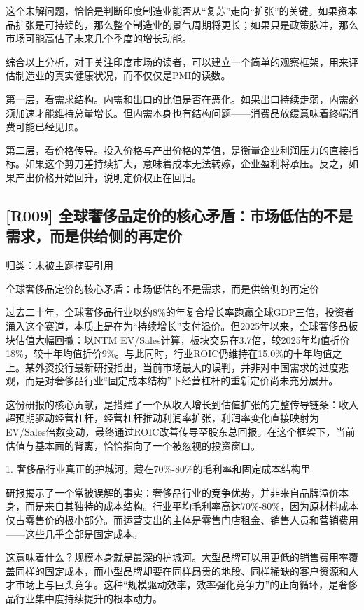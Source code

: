 \documentclass[11pt]{ctexart}
\begin{document}
这个未解问题，恰恰是判断印度制造业能否从“复苏”走向“扩张”的关键。如果资本品扩张是可持续的，那么整个制造业的景气周期将更长；如果只是政策脉冲，那么市场可能高估了未来几个季度的增长动能。

综合以上分析，对于关注印度市场的读者，可以建立一个简单的观察框架，用来评估制造业的真实健康状况，而不仅仅是PMI的读数。

第一层，看需求结构。内需和出口的比值是否在恶化。如果出口持续走弱，内需必须加速才能维持总量增长。但内需本身也有结构问题——消费品放缓意味着终端消费可能已经见顶。

第二层，看价格传导。投入价格与产出价格的差值，是衡量企业利润压力的直接指标。如果这个剪刀差持续扩大，意味着成本无法转嫁，企业盈利将承压。反之，如果产出价格开始回升，说明定价权正在回归。

\subsection{[R009] 全球奢侈品定价的核心矛盾：市场低估的不是需求，而是供给侧的再定价}
{\small\color{refgray}归类：未被主题摘要引用}

全球奢侈品定价的核心矛盾：市场低估的不是需求，而是供给侧的再定价

过去二十年，全球奢侈品行业以约8\%的年复合增长率跑赢全球GDP三倍，投资者涌入这个赛道，本质上是在为“持续增长”支付溢价。但2025年以来，全球奢侈品板块估值大幅回撤：以NTM EV/Sales计算，板块交易在3.7倍，较2025年均值折价18\%，较十年均值折价9\%。与此同时，行业ROIC仍维持在15.0\%的十年均值之上。某外资投行最新研报指出，当前市场最大的误判，并非对中国需求的过度悲观，而是对奢侈品行业“固定成本结构”下经营杠杆的重新定价尚未充分展开。

这份研报的核心贡献，是搭建了一个从收入增长到估值扩张的完整传导链条：收入超预期驱动经营杠杆，经营杠杆推动利润率扩张，利润率变化直接映射为EV/Sales倍数变动，最终通过ROIC改善传导至股东总回报。在这个框架下，当前估值与基本面的背离，恰恰指向了一个被忽视的投资窗口。

1. 奢侈品行业真正的护城河，藏在70\%-80\%的毛利率和固定成本结构里

研报揭示了一个常被误解的事实：奢侈品行业的竞争优势，并非来自品牌溢价本身，而是来自其独特的成本结构。行业平均毛利率高达70\%-80\%，因为原材料成本仅占零售价的极小部分。而运营支出的主体是零售门店租金、销售人员和营销费用——这些几乎全部是固定成本。

这意味着什么？规模本身就是最深的护城河。大型品牌可以用更低的销售费用率覆盖同样的固定成本，而小型品牌却要在同样昂贵的地段、同样稀缺的客户资源和人才市场上与巨头竞争。这种“规模驱动效率，效率强化竞争力”的正向循环，是奢侈品行业集中度持续提升的根本动力。
\end{document}
